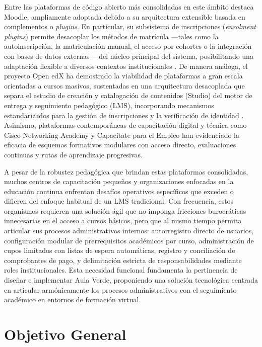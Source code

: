 Entre las plataformas de código abierto más consolidadas en este ámbito destaca Moodle, ampliamente adoptada debido a su arquitectura extensible basada en complementos o \textit{plugins}. En particular, su subsistema de inscripciones (\textit{enrolment plugins}) permite desacoplar los métodos de matrícula —tales como la autoinscripción, la matriculación manual, el acceso por cohortes o la integración con bases de datos externas— del núcleo principal del sistema, posibilitando una adaptación flexible a diversos contextos institucionales \cite{moodle2024enrolment}. De manera análoga, el proyecto Open edX ha demostrado la viabilidad de plataformas a gran escala orientadas a cursos masivos, sustentadas en una arquitectura desacoplada que separa el estudio de creación y catalogación de contenidos (Studio) del motor de entrega y seguimiento pedagógico (LMS), incorporando mecanismos estandarizados para la gestión de inscripciones y la verificación de identidad \cite{openedx2024platform}. Asimismo, plataformas contemporáneas de capacitación digital y técnica como Cisco Networking Academy \cite{cisco2024netacad} y Capacítate para el Empleo \cite{fundacion2024capacitate} han evidenciado la eficacia de esquemas formativos modulares con acceso directo, evaluaciones continuas y rutas de aprendizaje progresivas.

A pesar de la robustez pedagógica que brindan estas plataformas consolidadas, muchos centros de capacitación pequeños y organizaciones enfocadas en la educación continua enfrentan desafíos operativos específicos que exceden o difieren del enfoque habitual de un LMS tradicional. Con frecuencia, estos organismos requieren una solución ágil que no imponga fricciones burocráticas innecesarias en el acceso a cursos básicos, pero que al mismo tiempo permita articular sus procesos administrativos internos: autorregistro directo de usuarios, configuración modular de prerrequisitos académicos por curso, administración de cupos limitados con listas de espera automáticas, registro y conciliación de comprobantes de pago, y delimitación estricta de responsabilidades mediante roles institucionales. Esta necesidad funcional fundamenta la pertinencia de diseñar e implementar Aula Verde, proponiendo una solución tecnológica centrada en articular armónicamente los procesos administrativos con el seguimiento académico en entornos de formación virtual.

\section{Objetivo General}

